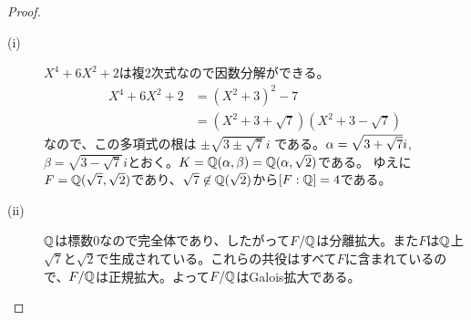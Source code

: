 \newpage


\begin{proof} ${}$
  \begin{description}
\item[(i)] $X^4 + 6X^2 + 2$は複2次式なので因数分解ができる。
 \begin{align*}
  X^4 + 6X^2 + 2 &= (X^2 + 3)^2 - 7 \\
  &= (X^2 + 3 + \sqrt{7} )(X^2 + 3 - \sqrt{7} )
  \end{align*}
  なので、この多項式の根は
  $
  \pm \sqrt{ 3 \pm \sqrt{7}  } i
  $
  である。${\alpha} = \sqrt{ 3 + \sqrt{7}  } i $, $\beta =  \sqrt{ 3 - \sqrt{7}  } i$とおく。$K = {\mathbb Q}({\alpha}, \beta) = {\mathbb Q}({\alpha}, \sqrt{2})$である。
  ゆえに$F = {\mathbb Q}(\sqrt{7}, \sqrt{2})$であり、$\sqrt{7} \not\in {\mathbb Q}(\sqrt{2})$から$[F:{\mathbb Q}] = 4$である。
  \item[(ii)] ${\mathbb Q}$は標数$0$なので完全体であり、したがって$F/{\mathbb Q}$は分離拡大。また$F$は${\mathbb Q}$上$\sqrt{7}$と$\sqrt{2}$で生成されている。これらの共役はすべて$F$に含まれているので、$F/{\mathbb Q}$は正規拡大。よって$F/{\mathbb Q}$はGalois拡大である。
  \end{description}
\end{proof}



\newpage


